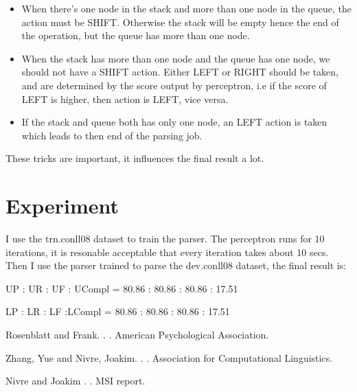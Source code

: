 \documentclass[11pt]{article}
\begin{document}
\begin{itemize}
\item When there's one node in the stack and more than one node in the queue, the action must be SHIFT. Otherwise the stack will be empty hence the end of the operation, but the queue has more than one node.
\item When the stack has more than one node and the queue has one node, we should not have a SHIFT action. Either LEFT or RIGHT should be taken, and are determined by the score output by perceptron, i.e if the score of LEFT is higher, then action is LEFT, vice versa.
\item If the stack and queue both has only one node, an LEFT action is taken which leads to then end of the parsing job.
\end{itemize}

These tricks are important, it influences the final result a lot.

\section {Experiment}

I use the trn.conll08 dataset to train the parser. The perceptron runs for 10 iterations, it is resonable acceptable that every iteration takes about 10 secs. Then I use the parser trained to parse the dev.conll08 dataset, the final result is:

UP : UR : UF : UCompl = 80.86 : 80.86 : 80.86 : 17.51

LP : LR : LF :LCompl = 80.86 : 80.86 : 80.86 : 17.51

\begin{thebibliography}{}

Rosenblatt and Frank.
.
.
\newblock American Psychological Association.

Zhang, Yue and Nivre, Joakim.
.
.
\newblock Association for Computational Linguistics.

Nivre and Joakim
.
.
\newblock MSI report.

\end{thebibliography}
\end{document}
